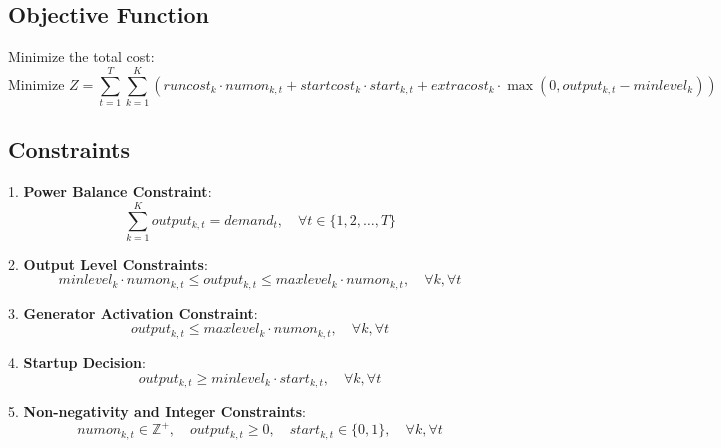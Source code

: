 \documentclass{article}
\begin{document}
\subsection*{Objective Function}
Minimize the total cost:
\[
\text{Minimize } Z = \sum_{t=1}^{T} \sum_{k=1}^{K} \left( runcost_k \cdot numon_{k,t} + startcost_k \cdot start_{k,t} + extracost_k \cdot \max(0, output_{k,t} - minlevel_k) \right)
\]

\subsection*{Constraints}

1. \textbf{Power Balance Constraint}:
\[
\sum_{k=1}^{K} output_{k,t} = demand_t, \quad \forall t \in \{1, 2, \ldots, T\}
\]

2. \textbf{Output Level Constraints}:
\[
minlevel_k \cdot numon_{k,t} \leq output_{k,t} \leq maxlevel_k \cdot numon_{k,t}, \quad \forall k, \forall t
\]

3. \textbf{Generator Activation Constraint}:
\[
output_{k,t} \leq maxlevel_k \cdot numon_{k,t}, \quad \forall k, \forall t
\]

4. \textbf{Startup Decision}:
\[
output_{k,t} \geq minlevel_k \cdot start_{k,t}, \quad \forall k, \forall t
\]

5. \textbf{Non-negativity and Integer Constraints}:
\[
numon_{k,t} \in \mathbb{Z}^+, \quad output_{k,t} \geq 0, \quad start_{k,t} \in \{0, 1\}, \quad \forall k, \forall t
\]
\end{document}
